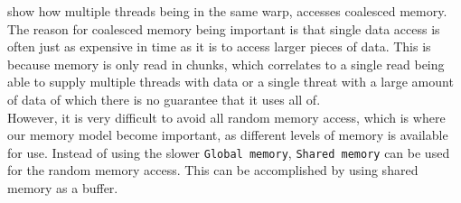  show how multiple threads being in the same warp, accesses coalesced memory. The reason for coalesced memory being important is that single data access is often just as expensive in time as it is to access larger pieces of data. This is because memory is only read in chunks, which correlates to a single read being able to supply multiple threads with data or a single threat with a large amount of data of which there is no guarantee that it uses all of.\\

However, it is very difficult to avoid all random memory access, which is where our memory model become important, as different levels of memory is available for use. Instead of using the slower \texttt{Global memory}, \texttt{Shared memory} can be used for the random memory access. This can be accomplished by using shared memory as a buffer.